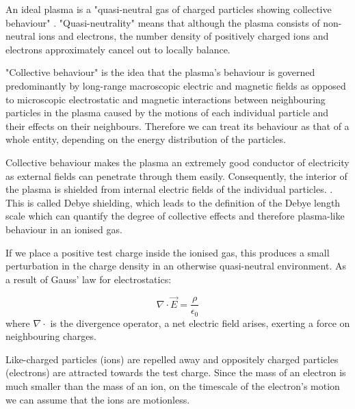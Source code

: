 \documentclass[a4paper,titlepage]{article}
\let\cite\parencite
\begin{document}
\begin{flushleft}
An ideal plasma is a "quasi-neutral gas of charged particles showing collective behaviour" \cite{gibbon_2014_introduction}. "Quasi-neutrality" means that although the plasma consists of non-neutral ions and electrons, the number density of positively charged ions and electrons approximately cancel out to locally balance. 

"Collective behaviour" is the idea that the plasma's behaviour is governed predominantly by long-range macroscopic electric and magnetic fields as opposed to microscopic electrostatic and magnetic interactions between neighbouring particles in the plasma caused by the motions of each individual particle and their effects on their neighbours. Therefore we can treat its behaviour as that of a whole entity, depending on the energy distribution of the particles. 

Collective behaviour makes the plasma an extremely good conductor of electricity as external fields can penetrate through them easily. Consequently, the interior of the plasma is shielded from internal electric fields of the individual particles. \cite{freidberg_2008_plasma}. This is called Debye shielding, which leads to the definition of the Debye length scale which can quantify the degree of collective effects and therefore plasma-like behaviour in an ionised gas. 

If we place a positive test charge inside the ionised gas, this produces a small perturbation in the charge density in an otherwise quasi-neutral environment. As a result of Gauss' law for electrostatics:

\begin{equation}
\nabla \cdot \vec{E} = \frac{\rho}{\epsilon_0}
\end{equation}
where $\nabla \cdot$ is the \gls{divergence} operator, a net electric field arises, exerting a force on neighbouring charges.

Like-charged particles (ions) are repelled away and oppositely charged particles (electrons) are attracted towards the test charge. Since the mass of an electron is much smaller than the mass of an ion, on the timescale of the electron's motion we can assume that the ions are motionless.



\end{flushleft}
\end{document}
